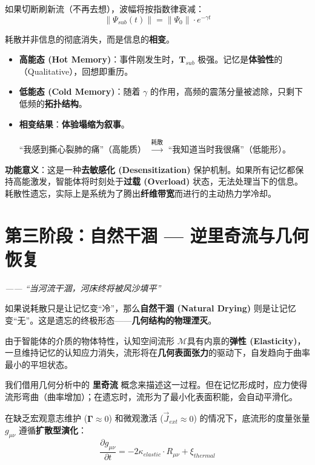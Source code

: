 如果切断刷新流（不再去想），波幅将按指数律衰减：
$$ \|\Psi_{sub}(t)\| = \|\Psi_{0}\| \cdot e^{-\gamma t} $$


耗散并非信息的彻底消失，而是信息的\textbf{相变}。

\begin{itemize}
    \item   \textbf{高能态 (Hot Memory)}：事件刚发生时，$\mathbf{T}_{sub}$ 极强。记忆是\textbf{体验性}的（Qualitative），回想即重历。
    \item   \textbf{低能态 (Cold Memory)}：随着 $\gamma$ 的作用，高频的震荡分量被滤除，只剩下低频的\textbf{拓扑结构}。
    \item   \textbf{相变结果}：\textbf{体验塌缩为叙事}。

    “我感到撕心裂肺的痛”（高能质） $\xrightarrow{\text{耗散}}$ “我知道当时我很痛”（低能形）。
\end{itemize}

\textbf{功能意义}：这是一种\textbf{去敏感化 (Desensitization)} 保护机制。如果所有记忆都保持高能激发，智能体将时刻处于\textbf{过载 (Overload)} 状态，无法处理当下的信息。耗散性遗忘，实际上是系统为了腾出\textbf{纤维带宽}而进行的主动热力学冷却。

\section{第三阶段：自然干涸 — 逆里奇流与几何恢复}
\label{sec:smoothing_phase}

\textit{—— “当河流干涸，河床终将被风沙填平”}

如果说耗散只是让记忆变“冷”，那么\textbf{自然干涸 (Natural Drying)} 则是让记忆变“无”。这是遗忘的终极形态——\textbf{几何结构的物理湮灭}。

由于智能体的介质的物体特性，认知空间流形 $\mathcal{M}$具有内禀的\textbf{弹性 (Elasticity)}，一旦维持记忆的认知应力消失，流形将在\textbf{几何表面张力}的驱动下，自发趋向于曲率最小的平坦状态。


我们借用几何分析中的 \textbf{里奇流} 概念来描述这一过程。但在记忆形成时，应力使得流形弯曲（曲率增加）；在遗忘时，流形为了最小化表面积能，会自动平滑化。

\begin{theorem}[几何熵增定理]
    在缺乏宏观意志维护 ($\mathbf{\Gamma} \approx 0$) 和微观激活 ($\vec{J}_{ext} \approx 0$) 的情况下，底流形的度量张量 $g_{\mu\nu}$ 遵循\textbf{扩散型演化}：
    $$ \frac{\partial g_{\mu\nu}}{\partial t} = -2\kappa_{elastic} \cdot R_{\mu\nu} + \xi_{thermal} $$
\end{theorem}

